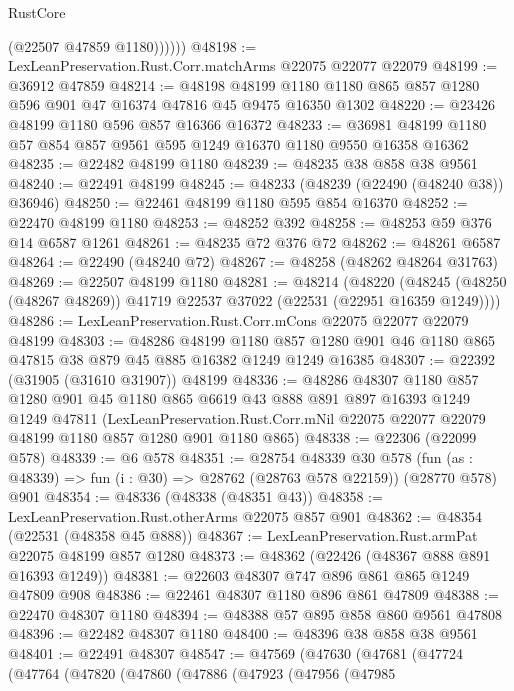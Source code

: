 \begin{lexlean}{RustCore}
\begin{coremodule}
              (@22507 @47859 @1180))))))
@48198 := LexLeanPreservation.Rust.Corr.matchArms @22075 @22077 @22079
@48199 := @36912 @47859
@48214 := @48198
    @48199
    @1180
    @1180
    @865
    @857
    @1280
    @596
    @901
    @47
    @16374
    @47816
    @45
    @9475
    @16350
    @1302
@48220 := @23426 @48199 @1180 @596 @857 @16366 @16372
@48233 := @36981 @48199 @1180 @57 @854 @857 @9561 @595 @1249 @16370 @1180 @9550 @16358 @16362
@48235 := @22482 @48199 @1180
@48239 := @48235 @38 @858 @38 @9561
@48240 := @22491 @48199
@48245 := @48233 (@48239 (@22490 (@48240 @38)) @36946)
@48250 := @22461 @48199 @1180 @595 @854 @16370
@48252 := @22470 @48199 @1180
@48253 := @48252 @392
@48258 := @48253 @59 @376 @14 @6587 @1261
@48261 := @48235 @72 @376 @72
@48262 := @48261 @6587
@48264 := @22490 (@48240 @72)
@48267 := @48258 (@48262 @48264 @31763)
@48269 := @22507 @48199 @1180
@48281 := @48214
    (@48220 (@48245 (@48250 (@48267 @48269)) @41719 @22537 @37022 (@22531 (@22951 @16359 @1249))))
@48286 := LexLeanPreservation.Rust.Corr.mCons @22075 @22077 @22079 @48199
@48303 := @48286
    @48199
    @1180
    @857
    @1280
    @901
    @46
    @1180
    @865
    @47815
    @38
    @879
    @45
    @885
    @16382
    @1249
    @1249
    @16385
@48307 := @22392 (@31905 (@31610 @31907)) @48199
@48336 := @48286
    @48307
    @1180
    @857
    @1280
    @901
    @45
    @1180
    @865
    @6619
    @43
    @888
    @891
    @897
    @16393
    @1249
    @1249
    @47811
    (LexLeanPreservation.Rust.Corr.mNil
      @22075
      @22077
      @22079
      @48199
      @1180
      @857
      @1280
      @901
      @1180
      @865)
@48338 := @22306 (@22099 @578)
@48339 := @6 @578
@48351 := @28754
    @48339
    @30
    @578
    (fun (as : @48339) => fun (i : @30) => @28762 (@28763 @578 @22159))
    (@28770 @578)
    @901
@48354 := @48336 (@48338 (@48351 @43))
@48358 := LexLeanPreservation.Rust.otherArms @22075 @857 @901
@48362 := @48354 (@22531 (@48358 @45 @888))
@48367 := LexLeanPreservation.Rust.armPat @22075 @48199 @857 @1280
@48373 := @48362 (@22426 (@48367 @888 @891 @16393 @1249))
@48381 := @22603 @48307 @747 @896 @861 @865 @1249 @47809 @908
@48386 := @22461 @48307 @1180 @896 @861 @47809
@48388 := @22470 @48307 @1180
@48394 := @48388 @57 @895 @858 @860 @9561 @47808
@48396 := @22482 @48307 @1180
@48400 := @48396 @38 @858 @38 @9561
@48401 := @22491 @48307
@48547 := @47569
    (@47630
      (@47681
        (@47724
          (@47764
            (@47820
              (@47860
                (@47886
                  (@47923
                    (@47956
                      (@47985

\end{coremodule}
\end{lexlean}
